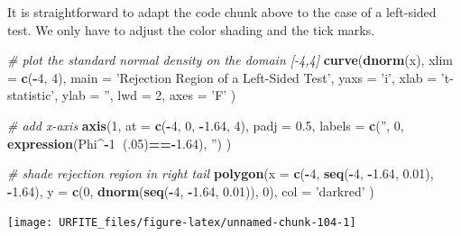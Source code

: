 \documentclass[]{book}
\newenvironment{Shaded}{\begin{snugshade}}{\end{snugshade}}
\newcommand{\KeywordTok}[1]{\textcolor[rgb]{0.13,0.29,0.53}{\textbf{#1}}}
\newcommand{\DataTypeTok}[1]{\textcolor[rgb]{0.13,0.29,0.53}{#1}}
\newcommand{\DecValTok}[1]{\textcolor[rgb]{0.00,0.00,0.81}{#1}}
\newcommand{\FloatTok}[1]{\textcolor[rgb]{0.00,0.00,0.81}{#1}}
\newcommand{\StringTok}[1]{\textcolor[rgb]{0.31,0.60,0.02}{#1}}
\newcommand{\CommentTok}[1]{\textcolor[rgb]{0.56,0.35,0.01}{\textit{#1}}}
\newcommand{\OperatorTok}[1]{\textcolor[rgb]{0.81,0.36,0.00}{\textbf{#1}}}
\newcommand{\NormalTok}[1]{#1}
\theoremstyle{definition}
\theoremstyle{definition}
\theoremstyle{definition}
\theoremstyle{remark}
\begin{document}
It is straightforward to adapt the code chunk above to the case of a
left-sided test. We only have to adjust the color shading and the tick
marks.

\begin{Shaded}
\begin{Highlighting}[]
\CommentTok{# plot the standard normal density on the domain [-4,4]}
\KeywordTok{curve}\NormalTok{(}\KeywordTok{dnorm}\NormalTok{(x),}
      \DataTypeTok{xlim =} \KeywordTok{c}\NormalTok{(}\OperatorTok{-}\DecValTok{4}\NormalTok{, }\DecValTok{4}\NormalTok{),}
      \DataTypeTok{main =} \StringTok{'Rejection Region of a Left-Sided Test'}\NormalTok{,}
      \DataTypeTok{yaxs =} \StringTok{'i'}\NormalTok{,}
      \DataTypeTok{xlab =} \StringTok{'t-statistic'}\NormalTok{,}
      \DataTypeTok{ylab =} \StringTok{''}\NormalTok{,}
      \DataTypeTok{lwd =} \DecValTok{2}\NormalTok{,}
      \DataTypeTok{axes =} \StringTok{'F'}
\NormalTok{)}

\CommentTok{# add x-axis}
\KeywordTok{axis}\NormalTok{(}\DecValTok{1}\NormalTok{, }
     \DataTypeTok{at =} \KeywordTok{c}\NormalTok{(}\OperatorTok{-}\DecValTok{4}\NormalTok{, }\DecValTok{0}\NormalTok{, }\OperatorTok{-}\FloatTok{1.64}\NormalTok{, }\DecValTok{4}\NormalTok{), }
     \DataTypeTok{padj =} \FloatTok{0.5}\NormalTok{,}
     \DataTypeTok{labels =} \KeywordTok{c}\NormalTok{(}\StringTok{''}\NormalTok{, }\DecValTok{0}\NormalTok{, }\KeywordTok{expression}\NormalTok{(Phi}\OperatorTok{^-}\DecValTok{1}\OperatorTok{~}\NormalTok{(.}\DecValTok{05}\NormalTok{)}\OperatorTok{==-}\FloatTok{1.64}\NormalTok{), }\StringTok{''}\NormalTok{)}
\NormalTok{)}

\CommentTok{# shade rejection region in right tail}
\KeywordTok{polygon}\NormalTok{(}\DataTypeTok{x =} \KeywordTok{c}\NormalTok{(}\OperatorTok{-}\DecValTok{4}\NormalTok{, }\KeywordTok{seq}\NormalTok{(}\OperatorTok{-}\DecValTok{4}\NormalTok{, }\OperatorTok{-}\FloatTok{1.64}\NormalTok{, }\FloatTok{0.01}\NormalTok{), }\OperatorTok{-}\FloatTok{1.64}\NormalTok{),}
        \DataTypeTok{y =} \KeywordTok{c}\NormalTok{(}\DecValTok{0}\NormalTok{, }\KeywordTok{dnorm}\NormalTok{(}\KeywordTok{seq}\NormalTok{(}\OperatorTok{-}\DecValTok{4}\NormalTok{, }\OperatorTok{-}\FloatTok{1.64}\NormalTok{, }\FloatTok{0.01}\NormalTok{)), }\DecValTok{0}\NormalTok{), }
        \DataTypeTok{col =} \StringTok{'darkred'}
\NormalTok{)}
\end{Highlighting}
\end{Shaded}

\begin{center}\texttt{[image: URFITE\_files/figure-latex/unnamed-chunk-104-1]} \end{center}
\end{document}
